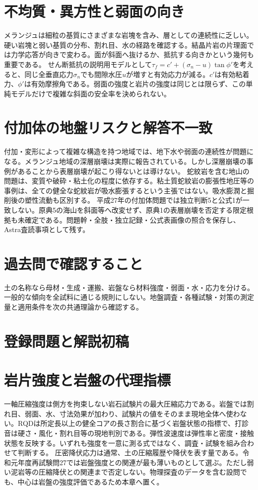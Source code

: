 \section{不均質・異方性と弱面の向き}
\label{theory:engineering:anisotropy}
メランジュは細粒の基質にさまざまな岩塊を含み、層としての連続性に乏しい。硬い岩塊と弱い基質の分布、割れ目、水の経路を確認する\cite{jseg_engineering_faq}。結晶片岩の片理面では力学応答が向きで変わる。面が斜面へ抜けるか、抵抗する向きかという幾何も重要である。
せん断抵抗の説明用モデルとして\(\tau_f=c'+(\sigma_n-u)\tan\phi'\)を考えると、同じ全垂直応力\(\sigma_n\)でも間隙水圧\(u\)が増すと有効応力が減る。\(c'\)は有効粘着力、\(\phi'\)は有効摩擦角である。弱面の強度と岩片の強度は同じとは限らず、この単純モデルだけで複雑な斜面の安全率を決められない。

\section{付加体の地盤リスクと解答不一致}
\label{theory:engineering:accretion}
付加・変形によって複雑な構造を持つ地域では、地下水や弱面の連続性が問題になる。メランジュ地域の深層崩壊は実際に報告されている\cite{kyoto_deep2018,sabo_deep2014}。しかし深層崩壊の事例があることから表層崩壊が起こり得ないとは導けない。
蛇紋岩を含む地山の問題は、変質や破砕・粘土化の程度に依存する。粘土質蛇紋岩の膨張性地圧等の事例は、全ての健全な蛇紋岩が吸水膨張するという主張ではない\cite{jsce_swelling2010,serpentinite_mechanics2003}。吸水膨潤と掘削後の塑性流動も区別する。
平成27年の付加体問題では独立判断5と公式1が一致しない。原典5の海山を斜面等へ改変せず、原典1の表層崩壊を否定する限定根拠も未確定である。問題幹・全肢・独立記録・公式表画像の照合を保存し、Astra査読事項として残す。

\section{過去問で確認すること}
土の名称なら母材・生成・運搬、岩盤なら材料強度・弱面・水・応力を分ける。一般的な傾向を全試料に通じる規則にしない。地盤調査・各種試験・対策の測定量と適用条件を次の共通理論から確認する。
\section{登録問題と解説初稿}
\section{岩片強度と岩盤の代理指標}
\label{theory:engineering:strengthindices}
一軸圧縮強度は側方を拘束しない岩石試験片の最大圧縮応力である。岩盤では割れ目、弱面、水、寸法効果が加わり、試験片の値をそのまま現地全体へ使わない。RQDは所定長以上の健全コアの長さ割合に基づく岩盤状態の指標で、打診音は硬さ・風化・割れ目等の現地判別である。弾性波速度は弾性率と密度・接触状態を反映する。いずれも強度を一意に測る式ではなく、調査・試験を組み合わせて判断する\cite{jseg_engineering_faq,geebec_ps}。
圧密降伏応力は通常、土の圧縮履歴や降伏を表す量である。令和元年度再試験問27では岩盤強度との関連が最も薄いものとして選ぶ。ただし弱い泥岩等の圧縮降伏との関連まで否定しない。物理探査のデータを含む設問でも、中心は岩盤の強度評価であるため本章へ置く。


